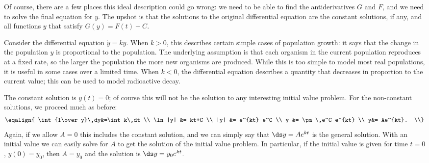 Of course, there are a few places this ideal description could go
wrong: we need to be able to find the antiderivatives $G$ and $F$, and
we need to solve the final equation for $y$.
The upshot is that the solutions to the original differential equation
are the constant solutions, if any, and all functions $y$ that satisfy
$G(y)=F(t)+C$.


\begin{example} Consider the differential equation $\dot y=ky$.
\label{exer:first simple linear homogeneous}
When $k>0$, this describes certain simple cases of population growth:
it says that the change in the population $y$ is proportional to the
population. The underlying assumption is that each organism in the
current population reproduces at a fixed rate, so the larger the
population the more new organisms are produced. While this is too
simple to model most real populations, it is useful in some cases over
a limited time. When $k<0$, the differential equation describes a
quantity that decreases in proportion to the current value; this can
be used to model radioactive decay.

The constant solution is $y(t)=0$; of course this will not be the
solution to any interesting initial value problem. 
For the non-constant solutions, we proceed much as before:
$$\eqalign{
\int {1\over y}\,dy&=\int k\,dt \\
\ln|y| &= kt+C \\
|y| &= e^{kt} e^C \\
y &= \pm \,e^C e^{kt}  \\
y&= Ae^{kt}. \\}$$
Again, if we allow $A=0$ this includes the constant solution, and we
can simply say that $\ds y=Ae^{kt}$ is the general solution. With an
initial value we can easily solve for $A$ to get the solution of the
initial value problem. In particular, if the initial value is
given for time $t=0$, $y(0)=y_0$, then $A=y_0$ and the solution
is $\ds y= y_0 e^{kt}$.
\end{example}

